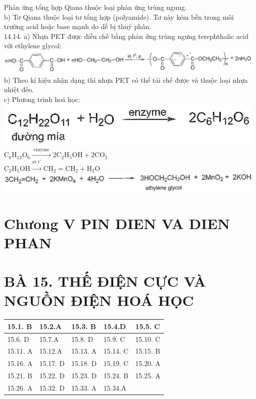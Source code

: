 \documentclass[10pt]{article}
\begin{document}
Phản ứng tổng hợp Qiana thuộc loại phản ứng trùng ngung.\\
b) Tơ Qiana thuộc loại tơ tổng hợp (polyamide). Tơ này kém bền trong môi trường acid hoặc base mạnh do dễ bị thuỷ phân.\\
14.14. a) Nhựa PET được điều chế bằng phản ứng trùng ngưng terephthalic acid với ethylene glycol:\\
\includegraphics[max width=\textwidth, center]{2025_10_23_b82d44049ffb48e891e8g-17(2)}\\
b) Theo kí hiệu nhận dạng thì nhựa PET có thể tái chế được và thuộc loại nhựa nhiệt đẻo.\\
c) Phưong trình hoá học:\\
\includegraphics[max width=\textwidth, center]{2025_10_23_b82d44049ffb48e891e8g-17}\\
$\mathrm{C}_{6} \mathrm{H}_{12} \mathrm{O}_{6} \xrightarrow{\text { enzyme }} 2 \mathrm{C}_{2} \mathrm{H}_{5} \mathrm{OH}+2 \mathrm{CO}_{2}$\\
$\mathrm{C}_{2} \mathrm{H}_{5} \mathrm{OH} \xrightarrow{\mathrm{xt}_{,} \mathrm{t}^{\circ}} \mathrm{CH}_{2}=\mathrm{CH}_{2}+\mathrm{H}_{2} \mathrm{O}$\\
\includegraphics[max width=\textwidth, center]{2025_10_23_b82d44049ffb48e891e8g-17(1)}

\section*{Chưong V PIN DIEN VA DIEN PHAN}
\section*{BÀ 15. THẾ ĐIỆN CỰC VÀ NGUỒN ĐIỆN HOÁ HỌC}
\begin{center}
\begin{tabular}{|l|l|l|l|l|}
\hline
15.1. B & 15.2.A & 15.3. B & 15.4.D & 15.5. C \\
\hline
15.6. D & 15.7.A & 15.8. D & 15.9. C & 15.10. C \\
\hline
15.11. A & 15.12.A & 15.13. A & 15.14. C & 15.15. B \\
\hline
15.16. A & 15.17. D & 15.18. D & 15.19. C & 15.20. A \\
\hline
15.21. B & 15.22. D & 15.23. D & 15.24. B & 15.25. A \\
\hline
15.26. A & 15.32. D & 15.33. A & 15.34.A &  \\
\hline
\end{tabular}
\end{center}
\end{document}
